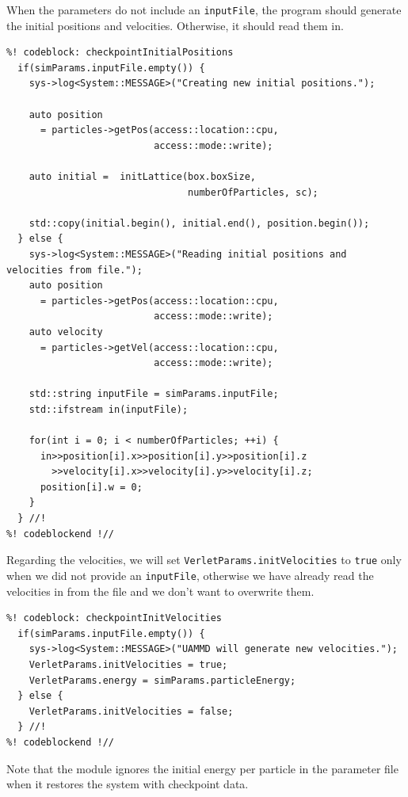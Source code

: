 When the parameters do not include an \texttt{inputFile}, the program should 
generate the initial positions and velocities. Otherwise, it should read them 
in.
\begin{lstlisting}
%! codeblock: checkpointInitialPositions
  if(simParams.inputFile.empty()) {
    sys->log<System::MESSAGE>("Creating new initial positions.");

    auto position
      = particles->getPos(access::location::cpu,
                          access::mode::write);

    auto initial =  initLattice(box.boxSize,
                                numberOfParticles, sc);

    std::copy(initial.begin(), initial.end(), position.begin());
  } else {
    sys->log<System::MESSAGE>("Reading initial positions and velocities from file.");
    auto position
      = particles->getPos(access::location::cpu,
                          access::mode::write);
    auto velocity
      = particles->getVel(access::location::cpu,
                          access::mode::write);

    std::string inputFile = simParams.inputFile;
    std::ifstream in(inputFile);

    for(int i = 0; i < numberOfParticles; ++i) {
      in>>position[i].x>>position[i].y>>position[i].z
        >>velocity[i].x>>velocity[i].y>>velocity[i].z;
      position[i].w = 0;
    }
  } //!
%! codeblockend !//
\end{lstlisting}

Regarding the velocities, we will set \texttt{VerletParams.initVelocities} to 
\texttt{true} only when we did not provide an \texttt{inputFile}, otherwise we 
have already read the velocities in from the file and we don't want to 
overwrite them.
\begin{lstlisting}
%! codeblock: checkpointInitVelocities
  if(simParams.inputFile.empty()) {
    sys->log<System::MESSAGE>("UAMMD will generate new velocities.");
    VerletParams.initVelocities = true;
    VerletParams.energy = simParams.particleEnergy;
  } else {
    VerletParams.initVelocities = false;
  } //!
%! codeblockend !//
\end{lstlisting}
Note that the module ignores the initial energy per particle in the parameter 
file when it restores the system with checkpoint data.

